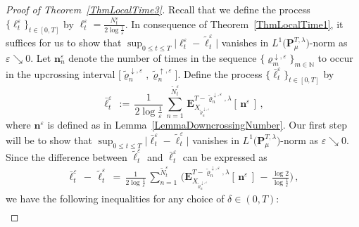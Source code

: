 \documentclass[10pt]{article}
\numberwithin{equation}{section}
\theoremstyle{definition}
\begin{document}
\begin{proof}[Proof of Theorem~\ref{ThmLocalTime3}] Recall that we define the process $\{\ell_t^{\varepsilon} \}_{t\in [0,T] } $ by $ \ell_t^{\varepsilon}= \frac{N_{t}^{\varepsilon} }{2\log \frac{1}{\varepsilon}  }$.  In consequence of Theorem~\ref{ThmLocalTime1}, it suffices for us to show that $\sup_{0\leq t\leq T}\big|\ell_t^{\varepsilon}-\widetilde{\ell}_t^{\varepsilon}  \big| $
vanishes in $L^1\big(\mathbf{P}^{T,\lambda}_{\mu}\big)$-norm as $\varepsilon\searrow 0$.  Let $\mathbf{n}^{\varepsilon}_{n}$ denote the number of  times in the sequence $\{ \varrho_{m}^{\downarrow,\varepsilon}\}_{m\in \mathbb{N}}$ to occur in the upcrossing interval $\big[\widetilde{\varrho}_{n}^{\downarrow,\varepsilon}, \widetilde{\varrho}_{n}^{\uparrow,\varepsilon}     \big]$.
Define the process $\{ \boldsymbol{\bar{\ell}}_t^{\varepsilon}\}_{t\in [0,T]} $ by
$$\boldsymbol{\bar{\ell}}_t^{\varepsilon}\,:=\, \frac{1}{2\log \frac{1}{\varepsilon} } \,\sum_{n=1}^{\widetilde{N}_t^{\varepsilon}} \, \mathbf{E}^{T-\widetilde{\varrho}_{n}^{\downarrow,\varepsilon},\lambda}_{X_{\widetilde{\varrho}_{n}^{\downarrow,\varepsilon}}}[\, \mathbf{n}^{\varepsilon}\,]\,, $$
 where  $\mathbf{n}^{\varepsilon} $ is  defined  as in Lemma~\ref{LemmaDowncrossingNumber}. 
Our first step will be to show that $\sup_{0\leq t\leq T}\big|  \boldsymbol{\bar{\ell}}_t^{\varepsilon}-\widetilde{\ell}_t^{\varepsilon}\big| $
vanishes in $L^1\big(\mathbf{P}^{T,\lambda}_{\mu}\big)$-norm as $\varepsilon\searrow 0$.  Since the difference between $\widetilde{\ell}_t^{\varepsilon}$  and $ \boldsymbol{\bar{\ell}}_t^{\varepsilon}$ can be expressed as
\begin{align*}
\boldsymbol{\bar{\ell}}_t^{\varepsilon}\,-\,\widetilde{\ell}_t^{\varepsilon} \,=\,  \frac{1}{2\log \frac{1}{\varepsilon} }\, \sum_{n=1}^{\widetilde{N}_t^{\varepsilon}} \,\bigg(  \mathbf{E}^{T-\widetilde{\varrho}_{n}^{\downarrow,\varepsilon},\lambda}_{X_{\widetilde{\varrho}_{n}^{\downarrow,\varepsilon}}}[\, \mathbf{n}^{\varepsilon}\,] \,-\, \frac{ \log 2 }{\log \frac{1}{\varepsilon}  } \bigg)\,,
\end{align*}
we have the following inequalities for any choice of $ \delta \in (0,T)$:
\begin{align}\label{Toof}

\end{align}
\end{proof}
\end{document}
